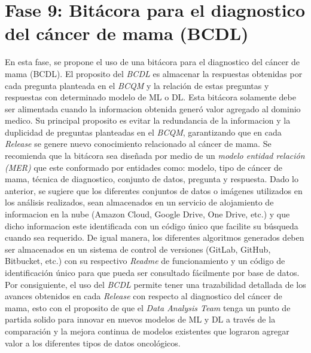 \section{Fase 9: Bitácora para el diagnostico del cáncer de mama (BCDL) }
En esta fase, se propone el uso de una bitácora para el diagnostico del cáncer de mama (BCDL). El proposito del \textit{BCDL} es almacenar la respuestas obtenidas por cada pregunta planteada en el \textit{BCQM} y la relación de estas preguntas y respuestas con determinado modelo de ML o DL. Esta bitácora solamente debe ser alimentada cuando la informacion obtenida generó valor agregado al dominio medico. Su principal proposito es evitar la redundancia de la informacion y la duplicidad de preguntas planteadas en el \textit{BCQM}, garantizando que en cada \textit{Release} se genere nuevo conocimiento relacionado al cáncer de mama. Se recomienda que la bitácora sea diseñada por medio de un \textit{modelo entidad relación (MER)} que este conformado por entidades como: modelo, tipo de cáncer de mama, técnica de diagnostico, conjunto de datos, pregunta y respuesta. Dado lo anterior, se sugiere que  los diferentes conjuntos de datos o imágenes utilizados en los análisis realizados, sean almacenados en un servicio de alojamiento de informacion en la nube (Amazon Cloud, Google Drive, One Drive, etc.) y que dicho informacion este identificada con un código único que facilite su búsqueda cuando sea requerido. De igual manera, los diferentes algoritmos generados deben ser almacenados en un sistema de control de versiones (GitLab, GitHub, Bitbucket, etc.) con su respectivo \textit{Readme} de funcionamiento y un código de identificación único para que pueda ser consultado fácilmente por base de datos. Por consiguiente, el uso del \textit{BCDL} permite tener una trazabilidad detallada de los avances obtenidos en cada \textit{Release} con respecto al diagnostico del cáncer de mama, esto con el proposito de que el \textit{Data Analysis Team} tenga un punto de partida solido para innovar en nuevos modelos de ML y DL a través de la comparación  y la mejora continua de modelos existentes que lograron agregar valor a los diferentes tipos de datos oncológicos.